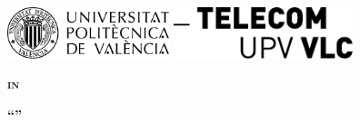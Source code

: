 % 
% 
% 



\thispagestyle{empty}

\setcounter{page}{1}




\begin{center}
    \includegraphics[height=15mm]{opening/resources/logos/logo_upv.pdf}
    \hfill
    \includegraphics[height=15mm]{opening/resources/logos/logo_upv_telcom.pdf}
\end{center}

\vspace*{30mm}

\begin{center}
    \textbf{\large \textsc{{\thesisDegree} in}}
\end{center}

\vspace*{0mm}

\begin{center}
    \textbf{\large \thesisType}
\end{center}

\vspace*{10mm}

\begin{center}
    \textbf{{\LARGE {}``\thesisTitle''}}\\
\end{center}

